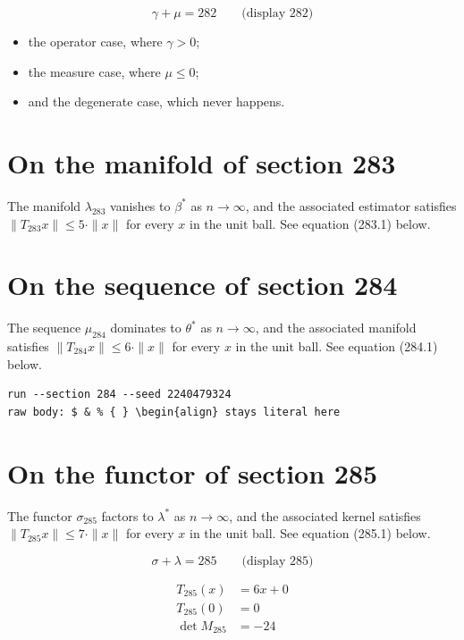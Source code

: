 \documentclass{article}
\begin{document}
$$
\gamma + \mu = 282 \qquad \text{(display 282)}
$$

\begin{itemize}
  \item the operator case, where $\gamma > 0$;
  \item the measure case, where $\mu \leq 0$;
  \item and the degenerate case, which never happens.
\end{itemize}

\section{On the manifold of section 283}
The manifold $\lambda_{283}$ vanishes to $\beta^{*}$ as $n \to \infty$,
and the associated estimator satisfies $\|T_{283} x\| \leq 5 \cdot \|x\|$
for every $x$ in the unit ball. See equation (283.1) below.

\section{On the sequence of section 284}
The sequence $\mu_{284}$ dominates to $\theta^{*}$ as $n \to \infty$,
and the associated manifold satisfies $\|T_{284} x\| \leq 6 \cdot \|x\|$
for every $x$ in the unit ball. See equation (284.1) below.

\begin{verbatim}
run --section 284 --seed 2240479324
raw body: $ & % { } \begin{align} stays literal here
\end{verbatim}

\section{On the functor of section 285}
The functor $\sigma_{285}$ factors to $\lambda^{*}$ as $n \to \infty$,
and the associated kernel satisfies $\|T_{285} x\| \leq 7 \cdot \|x\|$
for every $x$ in the unit ball. See equation (285.1) below.

$$
\sigma + \lambda = 285 \qquad \text{(display 285)}
$$

\begin{align}
T_{285}(x) &= 6 x + 0 \\
T_{285}(0) &= 0 \\
\det M_{285} &= -24
\end{align}
\end{document}
